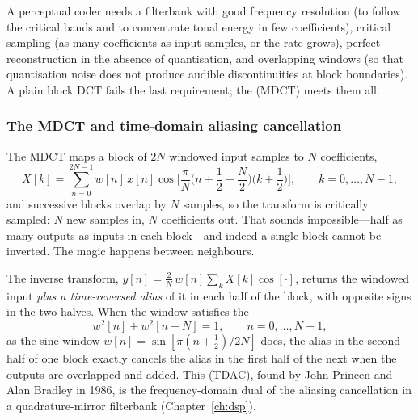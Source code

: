 A perceptual coder needs a filterbank with good frequency resolution (to follow the critical bands
and to concentrate tonal energy in few coefficients), critical sampling (as many coefficients as input
samples, or the rate grows), perfect reconstruction in the absence of quantisation, and overlapping
windows (so that quantisation noise does not produce audible discontinuities at block boundaries). A
plain block DCT fails the last requirement; the  (MDCT) meets
them all.

\subsubsection{The MDCT and time-domain aliasing cancellation}

The MDCT maps a block of $2N$ windowed input samples to $N$ coefficients,
\begin{equation}
X[k]=\sum_{n=0}^{2N-1}w[n]\,x[n]\cos\!\Big[\frac{\pi}{N}\Big(n+\frac12+\frac N2\Big)\Big(k+\frac12\Big)\Big],\qquad k=0,\dots,N-1,
\label{eq:ch16:mdct}
\end{equation}
and successive blocks overlap by $N$ samples, so the transform is critically sampled: $N$ new samples
in, $N$ coefficients out. That sounds impossible---half as many outputs as inputs in each block---and
indeed a single block cannot be inverted. The magic happens between neighbours.



\begin{deeper}
The inverse transform, $y[n]=\frac2N\,w[n]\sum_kX[k]\cos[\cdot]$, returns the windowed input
\emph{plus a time-reversed alias} of it in each half of the block, with opposite signs in the two
halves. When the window satisfies the 
\begin{equation}
w^2[n]+w^2[n+N]=1,\qquad n=0,\dots,N-1,
\label{eq:ch16:pb}
\end{equation}
as the sine window $w[n]=\sin[\pi(n+\frac12)/2N]$ does, the alias in the second half of one block
exactly cancels the alias in the first half of the next when the outputs are overlapped and added.
This  (TDAC), found by John Princen and Alan Bradley in 1986,
is the frequency-domain dual of the aliasing cancellation in a quadrature-mirror filterbank
(Chapter~\ref{ch:dsp}).
\end{deeper}

